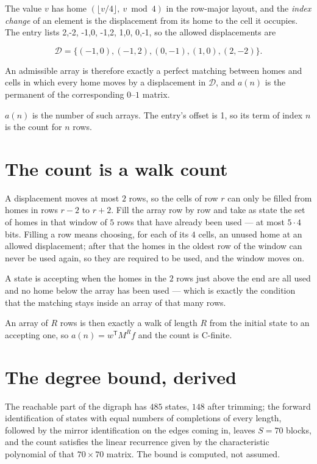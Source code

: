 \documentclass[11pt]{article}
\theoremstyle{definition}
\begin{document}
The value $v$ has home $(\lfloor v/4\rfloor,\ v \bmod 4)$ in the row-major layout, and the {\itshape index change} of an element is the displacement from its home to the cell it occupies. The entry lists 2,-2, -1,0, -1,2, 1,0, 0,-1, so the allowed displacements are

\[\mathcal{D} = \{(-1,0), (-1,2), (0,-1), (1,0), (2,-2)\}.\]

An admissible array is therefore exactly a perfect matching between homes and cells in which every home moves by a displacement in $\mathcal{D}$, and $a(n)$ is the permanent of the corresponding $0$--$1$ matrix.

$a(n)$ is the number of such arrays. The entry's offset is 1, so its term of index $n$ is the count for $n$ rows.

\section{The count is a walk count}

A displacement moves at most $2$ rows, so the cells of row $r$ can only be filled from homes in rows $r-2$ to $r+2$. Fill the array row by row and take as state the set of homes in that window of $5$ rows that have already been used --- at most $5\cdot4$ bits. Filling a row means choosing, for each of its $4$ cells, an unused home at an allowed displacement; after that the homes in the oldest row of the window can never be used again, so they are required to be used, and the window moves on.

A state is accepting when the homes in the $2$ rows just above the end are all used and no home below the array has been used --- which is exactly the condition that the matching stays inside an array of that many rows.

An array of $R$ rows is then exactly a walk of length $R$ from the initial state to an accepting one, so $a(n) = w^{\mathsf T}M^{R}f$ and the count is C-finite.

\section{The degree bound, derived}

The reachable part of the digraph has $485$ states, $148$ after trimming; the forward identification of states with equal numbers of completions of every length, followed by the mirror identification on the edges coming in, leaves $S = 70$ blocks, and the count satisfies the linear recurrence given by the characteristic polynomial of that $70\times70$ matrix. The bound is computed, not assumed.
\end{document}
